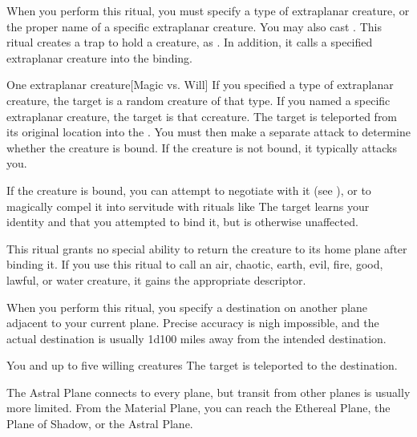 \spellspecial When you perform this ritual, you must specify a type of extraplanar creature, or the proper name of a specific extraplanar creature. You may also cast .
\spellline
\spelleffect This ritual creates a trap to hold a creature, as . In addition, it calls a specified extraplanar creature into the binding.
\begin{spelltarget}{One extraplanar creature}[Magic vs. Will]
    \spellspecial If you specified a type of extraplanar creature, the target is a random creature of that type. If you named a specific extraplanar creature, the target is that ccreature.
    \spellsuccess The target is teleported from its original location into the . You must then make a separate attack to determine whether the creature is bound. If the creature is not bound, it typically attacks you.

    If the creature is bound, you can attempt to negotiate with it (see ), or to magically compel it into servitude with rituals like 
    \spellfailure The target learns your identity and that you attempted to bind it, but is otherwise unaffected.
\end{spelltarget}
\spellnotes This ritual grants no special ability to return the creature to its home plane after binding it. If you use this ritual to call an air, chaotic, earth, evil, fire, good, lawful, or water creature, it gains the appropriate descriptor.

\spellspecial When you perform this ritual, you specify a destination on another plane adjacent to your current plane. Precise accuracy is nigh impossible, and the actual destination is usually 1d100 miles away from the intended destination.
\begin{spelltargets}{You and up to five willing creatures}
    \spelleffect The target is teleported to the destination.
\end{spelltargets}
\spellnotes The Astral Plane connects to every plane, but transit from other planes is usually more limited. From the Material Plane, you can reach the Ethereal Plane, the Plane of Shadow, or the Astral Plane.

